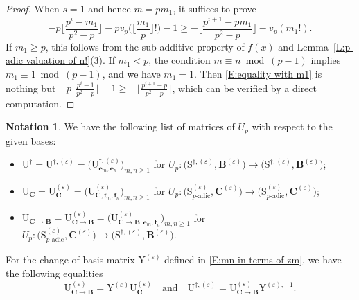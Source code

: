 \documentclass[12pt]{amsart}
\theoremstyle{definition}
\newtheorem{notation}[subsection]{Notation}
\numberwithin{equation}{subsection}
\def\bfB{\mathbf{B}}
\def\bfe{\mathbf{e}}
\def\bff{\mathbf{f}}
\def\bfC{\mathbf{C}}
\def\rmU{\mathrm{U}}
\def\rmY{\mathrm{Y}}
\def\rmS{\mathrm{S}}
\begin{document}
\begin{proof}
When $s=1$ and hence $m=pm_1$, it suffices to prove
\begin{equation}
\label{E:equality with m1}
-p\Big\lfloor \frac{p^i-m_1}{p^2-p}\Big\rfloor -pv_p\Big(\Big\lfloor \frac{m_1}{p}\Big\rfloor! \Big)-1\geq -\Big\lfloor \frac{p^{i+1}-pm_1}{p^2-p} \Big\rfloor-v_p(m_1!).
\end{equation}
If $m_1\geq p$, this follows from the sub-additive property of $f(x)$ and Lemma~\ref{L:p-adic valuation of n!}(3). If $m_1<p$, the condition $m\equiv n \bmod (p-1)$ implies $m_1 \equiv 1 \bmod (p-1)$, and we have $m_1=1$. Then \eqref{E:equality with m1} is nothing but $-p \big\lfloor \frac{p^i-1}{p^2-p}\rfloor - 1 \geq - \big\lfloor\frac{p^{i+1}-p}{p^2-p}\big\rfloor$, which can be verified by a direct computation.
\end{proof}

\begin{notation}
\label{N:matrix of Up for various basis}
We have the following list of matrices of $U_p$ with respect to the given bases:
\begin{itemize}
\item $\rmU^\dagger = \rmU^{\dagger,(\varepsilon)} =\big( \rmU^{\dagger,(\varepsilon)}_{\bfe_m, \bfe_n}\big)_{m,n\geq 1}$ for $U_p: \big( \rmS^{\dagger,(\varepsilon)}, \bfB^{(\varepsilon)}\big)  \longrightarrow \big( \rmS^{\dagger,(\varepsilon)}, \bfB^{(\varepsilon)}\big)$;
\item
$\rmU_{\bfC} = \rmU_\bfC^{(\varepsilon)}=\big( \rmU^{(\varepsilon)}_{\bfC,\bff_m, \bff_n}\big)_{m,n\geq 1}$ for $U_p: \big( \rmS^{(\varepsilon)}_{p\textrm{-adic}}, \bfC^{(\varepsilon)}\big)  \longrightarrow \big( \rmS^{(\varepsilon)}_{p\textrm{-adic}}, \bfC^{(\varepsilon)}\big)$;
\item 
$\rmU_{\bfC\to \bfB} = \rmU_{\bfC\to \bfB}^{(\varepsilon)}=\big( \rmU^{(\varepsilon)}_{\bfC \to \bfB,\bfe_m, \bff_n}\big)_{m,n\geq 1}$ for $U_p: \big( \rmS^{(\varepsilon)}_{p\textrm{-adic}}, \bfC^{(\varepsilon)}\big)  \longrightarrow \big( \rmS^{\dagger,(\varepsilon)}, \bfB^{(\varepsilon)}\big)$.
\end{itemize}
For the change of basis matrix $\rmY^{(\varepsilon)}$ defined in \eqref{E:mn in terms of zm}, we have the following equalities
\begin{equation}
\label{E:many change of basis equalities}
\rmU_{\bfC \to \bfB}^{(\varepsilon)} = \rmY^{(\varepsilon)} \rmU^{(\varepsilon)}_{\bfC} \quad \textrm{and}\quad 
\rmU^{\dagger, (\varepsilon)} = \rmU^{(\varepsilon)}_{\bfC \to \bfB} \rmY^{(\varepsilon),-1}.
\end{equation}
\end{notation}
\end{document}
